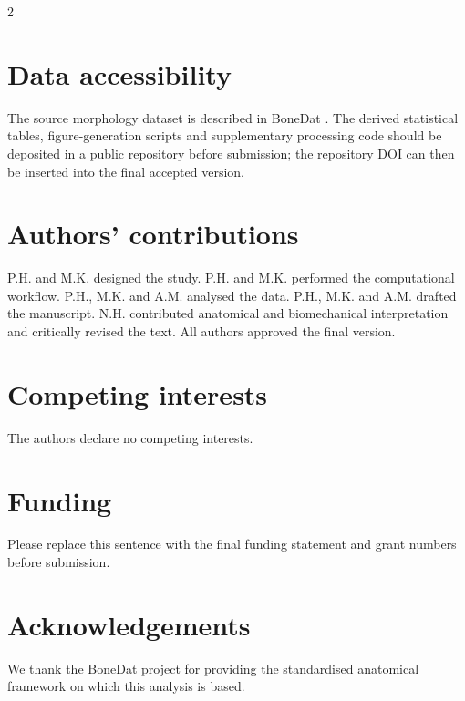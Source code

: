 \documentclass[openacc]{rsproca_new}
\begin{document}
\begin{multicols}{2}
\section*{Data accessibility}

The source morphology dataset is described in BoneDat \cite{HenysKuchar2025}. The derived statistical tables, figure-generation scripts and supplementary processing code should be deposited in a public repository before submission; the repository DOI can then be inserted into the final accepted version.

\section*{Authors' contributions}

P.H. and M.K. designed the study. P.H. and M.K. performed the computational workflow. P.H., M.K. and A.M. analysed the data. P.H., M.K. and A.M. drafted the manuscript. N.H. contributed anatomical and biomechanical interpretation and critically revised the text. All authors approved the final version.

\section*{Competing interests}

The authors declare no competing interests.

\section*{Funding}

Please replace this sentence with the final funding statement and grant numbers before submission.

\section*{Acknowledgements}

We thank the BoneDat project for providing the standardised anatomical framework on which this analysis is based.

\end{multicols}
\end{document}
